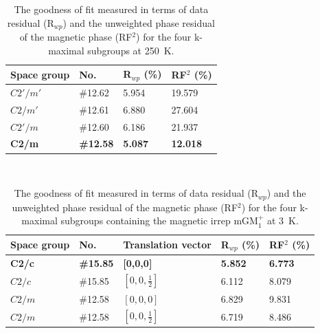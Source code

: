 \documentclass[letterpaper,10pt,doublespacing,edeposit]{uiucthesis2020}
\begin{document}
\begin{mainmatter}
\FloatBarrier

\begin{table}
\caption{\label{tab:refinement_250_K} 
The goodness of fit measured in terms of data residual (R$_{wp}$) and the unweighted phase residual of the magnetic phase (RF$^2$) for the four k-maximal subgroups at 250~K. 
}
\centering
\begin{tabular}{p{3cm}p{2.5cm}p{2.5cm}p{2.5cm}}
\hline\hline
\textbf{Space group} & \textbf{No.} & \textbf{R$_{wp}$ (\%)} & \textbf{RF$^2$ (\%)}\\
\hline\hline
$C2'/m'$ & $\#$12.62 & 5.954 &  19.579\\
$C2/m'$ & $\#$12.61 & 6.880 &  27.604\\
$C2'/m$ & $\#$12.60 & 6.186 &  21.937\\
\textbf{C2/m} & \textbf{\#12.58} & \textbf{5.087} &  \textbf{12.018}\\
\hline\hline
\end{tabular}
~\\
\end{table}

\begin{table}
\caption{\label{tab:refinement_3_K} 
The goodness of fit measured in terms of data residual (R$_{wp}$) and the unweighted phase residual of the magnetic phase (RF$^2$) for the four k-maximal subgroups containing the magnetic irrep mGM$_1^+$ at 3~K.
}
\centering
\begin{tabular}{p{3cm}p{2cm}p{3cm}p{2.5cm}p{2.5cm}}
\hline\hline
\textbf{Space group} & \textbf{No.} & \textbf{Translation vector} & \textbf{R$_{wp}$ (\%)} & \textbf{RF$^2$ (\%)}\\
\hline\hline
\textbf{C2/c} & \textbf{\#15.85} & \textbf{[0,0,0]} & \textbf{5.852} &  \textbf{6.773}\\
$C2/c$ & $\#$15.85 & $[0,0,\frac{1}{2}]$ & 6.112 &  8.079\\
$C2/m$ & $\#$12.58 & $[0,0,0]$ & 6.829 &  9.831\\
$C2/m$ & $\#$12.58 & $[0,0,\frac{1}{2}]$ & 6.719 &  8.486\\
\hline\hline
\end{tabular}
~\\
\end{table}


\end{mainmatter}
\end{document}
